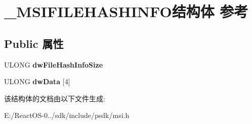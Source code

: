 \hypertarget{struct___m_s_i_f_i_l_e_h_a_s_h_i_n_f_o}{}\section{\+\_\+\+M\+S\+I\+F\+I\+L\+E\+H\+A\+S\+H\+I\+N\+F\+O结构体 参考}
\label{struct___m_s_i_f_i_l_e_h_a_s_h_i_n_f_o}
\subsection*{Public 属性}
\begin{DoxyCompactItemize}
\item 
\mbox{\label{struct___m_s_i_f_i_l_e_h_a_s_h_i_n_f_o_a2baf32346020f7daef09fb10754a5345}} 
U\+L\+O\+NG {\bfseries dw\+File\+Hash\+Info\+Size}
\item 
\mbox{\label{struct___m_s_i_f_i_l_e_h_a_s_h_i_n_f_o_a49e58fe328cf3b73cb228ea04580f2c1}} 
U\+L\+O\+NG {\bfseries dw\+Data} \mbox{[}4\mbox{]}
\end{DoxyCompactItemize}


该结构体的文档由以下文件生成\+:\begin{DoxyCompactItemize}
\item 
E\+:/\+React\+O\+S-\/0../sdk/include/psdk/msi.\+h\end{DoxyCompactItemize}
